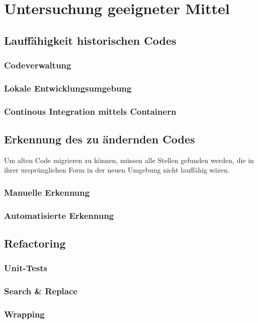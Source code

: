 \chapter{Untersuchung geeigneter Mittel}\label{ch:tools} 

\section{Lauffähigkeit historischen Codes}
\subsection{Codeverwaltung}
\subsection{Lokale Entwicklungsumgebung}
\subsection{Continous Integration mittels Containern}

\section{Erkennung des zu ändernden Codes}
Um alten Code migrieren zu können, müssen alle Stellen gefunden werden, die in ihrer ursprünglichen Form in der neuen Umgebung nicht lauffähig wären.
\subsection{Manuelle Erkennung}

\subsection{Automatisierte Erkennung}

\section{Refactoring}
\subsection{Unit-Tests}
\subsection{Search \& Replace}
\subsection{Wrapping}
